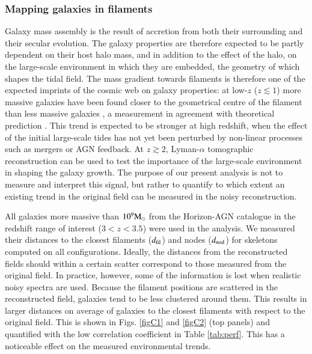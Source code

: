 \documentclass{aa}
\begin{document}
\subsubsection{Mapping galaxies in filaments}
\label{sec:mapgal}
Galaxy mass assembly is the result of  accretion from both their surrounding and their secular evolution. The galaxy properties are therefore expected to be partly dependent on their host halo mass, and in addition to the effect of the halo, on the large-scale environment in which they are embedded, the geometry of which shapes the tidal field. The mass gradient towards filaments is therefore one of the  expected imprints of the cosmic web on galaxy properties: at low-$z$ ($z \lesssim 1$) more massive galaxies have been found closer to the geometrical centre of the filament than less massive galaxies \citep{ Malavasi2017,Kraljic2018,Laigle2018}, a measurement in agreement with  theoretical prediction \citep{Musso2018}. This trend is expected to be stronger at high redshift, when the  effect of the initial large-scale tides has not yet been perturbed by non-linear processes such as mergers or AGN feedback. At $z \gtrsim 2$, Lyman-$\alpha$ tomographic reconstruction can be used to test the importance of the large-scale environment in shaping the galaxy growth. The purpose of our present analysis is not to  measure and interpret this signal, but rather to quantify to which extent an existing trend in the original field can be measured in the noisy reconstruction. 

All  galaxies more massive than $10^{9} {\rm M}_{\odot}$ from the {\sc Horizon-AGN} catalogue in the redshift range of interest ($3<z<3.5$) were used in the analysis.  We measured their distances to the closest filaments ($d_{\rm fil}$) and nodes ($d_{\rm nod}$) for skeletons computed on all configurations. Ideally, the distances from the reconstructed fields should within a certain scatter correspond to those measured from the original field. In practice, however, some of the information is lost when  realistic noisy spectra are used. Because the filament positions are  scattered in the reconstructed field, galaxies tend to be less clustered around them. 
This results in larger distances on average of galaxies to the closest filaments with respect to the original field. This is shown in Figs. \ref{figC1} and \ref{figC2} (top panels) and quantified with the low correlation coefficient in Table \ref{tab:perf}. This has a noticeable effect on the measured environmental trends. 
\end{document}
